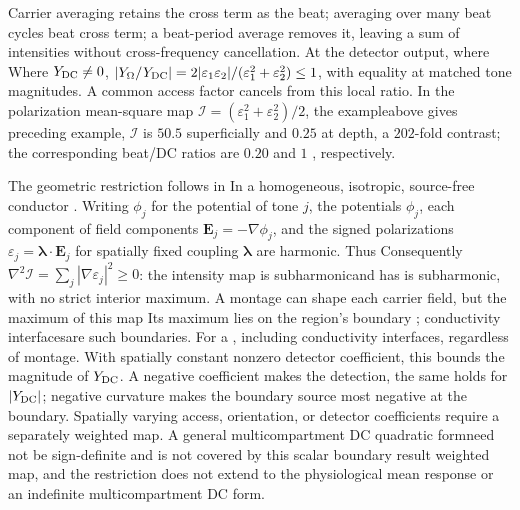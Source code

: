 \documentclass[11pt,a4paper]{article}
\providecommand{\DIFaddtex}[1]{{\protect\color{blue} \sf #1}} %
\providecommand{\DIFdeltex}[1]{{\protect\color{red} \scriptsize #1}} %
\providecommand{\DIFaddbegin}{} %
\providecommand{\DIFaddend}{} %
\providecommand{\DIFdelbegin}{} %
\providecommand{\DIFdelend}{} %
\providecommand{\DIFadd}[1]{\texorpdfstring{\DIFaddtex{#1}}{#1}} %
\providecommand{\DIFdel}[1]{\texorpdfstring{\DIFdeltex{#1}}{}} %
\begin{document}
Carrier averaging retains the \DIFdelbegin \DIFdel{cross term as the beat; averaging over many beat cycles }\DIFdelend \DIFaddbegin \DIFadd{beat cross term; a beat-period average }\DIFaddend removes
it, leaving \DIFdelbegin \DIFdel{a sum of }\DIFdelend intensities without cross-frequency cancellation. \DIFdelbegin \DIFdel{At the detector output, where }\DIFdelend \DIFaddbegin \DIFadd{Where
}\DIFaddend $Y_{\rm DC}\ne0$,
$|Y_\Omega/Y_{\rm DC}|=2|\varepsilon_1\varepsilon_2|/
(\varepsilon_1^2+\varepsilon_2^2)\le1$, with equality at matched \DIFdelbegin \DIFdel{tone }\DIFdelend magnitudes.
A common access factor cancels\DIFdelbegin \DIFdel{from this local ratio}\DIFdelend . In the \DIFdelbegin \DIFdel{polarization
mean-square map $\mathcal I=(\varepsilon_1^2+\varepsilon_2^2)/2$, the exampleabove gives }\DIFdelend \DIFaddbegin \DIFadd{preceding example, $\mathcal I$ is
}\DIFaddend $50.5$ superficially and $0.25$ at depth, a $202$-fold contrast;
the \DIFaddbegin \DIFadd{corresponding }\DIFaddend beat/DC ratios are $0.20$ and $1$\DIFdelbegin \DIFdel{, respectively}\DIFdelend .

\DIFdelbegin \DIFdel{The geometric restriction follows in }\DIFdelend \DIFaddbegin \DIFadd{In }\DIFaddend a homogeneous, isotropic, source-free conductor\DIFdelbegin \DIFdel{. Writing $\phi_j$ for the potential of tone $j$}\DIFdelend , the potentials $\phi_j$,
\DIFdelbegin \DIFdel{each component of }\DIFdelend \DIFaddbegin \DIFadd{field components }\DIFaddend $\mathbf E_j=-\nabla\phi_j$, and \DIFdelbegin \DIFdel{the
signed }\DIFdelend polarizations
$\varepsilon_j=\boldsymbol\lambda\cdot\mathbf E_j$ for spatially fixed
coupling $\boldsymbol\lambda$ are harmonic. \DIFdelbegin \DIFdel{Thus
}\DIFdelend \DIFaddbegin \DIFadd{Consequently
}\DIFaddend $\nabla^2\mathcal I=\sum_j|\nabla\varepsilon_j|^2\ge0$:
the intensity \DIFdelbegin \DIFdel{map is subharmonicand has }\DIFdelend \DIFaddbegin \DIFadd{is subharmonic, with }\DIFaddend no strict interior maximum. \DIFdelbegin \DIFdel{A montage can shape each
carrier field, but the maximum
of this map }\DIFdelend \DIFaddbegin \DIFadd{Its maximum
}\DIFaddend lies on the region's boundary\DIFdelbegin \DIFdel{;
conductivity interfacesare such boundaries. For a }\DIFdelend \DIFaddbegin \DIFadd{, including conductivity interfaces, regardless
of montage. With }\DIFaddend spatially constant nonzero \DIFdelbegin \DIFdel{detector coefficient, this bounds the magnitude
of $Y_{\rm DC}$. A negative coefficient makes the }\DIFdelend \DIFaddbegin \DIFadd{detection, the same holds for
$|Y_{\rm DC}|$; negative curvature makes the boundary }\DIFaddend source most negative\DIFdelbegin \DIFdel{at the
boundary}\DIFdelend .
Spatially varying \DIFaddbegin \DIFadd{access, orientation, or detector }\DIFaddend coefficients require a
\DIFdelbegin \DIFdel{separately weighted map. A general
multicompartment DC quadratic formneed not be sign-definite and is not
covered by this scalar boundary result}\DIFdelend \DIFaddbegin \DIFadd{weighted map, and the restriction does not extend to the physiological mean
response or an indefinite multicompartment DC form}\DIFaddend .
\end{document}
